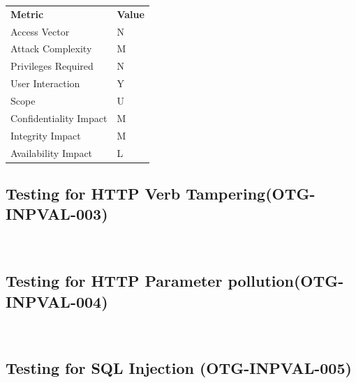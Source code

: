 \documentclass[headsepline,footsepline,footinclude=false,oneside,fontsize=11pt,paper=a4,listof=totoc,bibliography=totoc]{scrbook} %
\begin{document}
\vspace{0.5cm}
\begin{center}
	\begin{tabular}{ll}
		\rowcolor[HTML]{34CDF9}
		{\color[HTML]{ECF4FF} \textbf{Metric}}        & {\color[HTML]{ECF4FF} \textbf{Value}} \\
		\rowcolor[HTML]{BBDAFF}
		{\color[HTML]{333333} Access Vector}          & {\color[HTML]{333333} N}               \\
		\rowcolor[HTML]{ECF4FF}
		{\color[HTML]{333333} Attack Complexity}      & {\color[HTML]{333333} M}               \\
		\rowcolor[HTML]{BBDAFF}
		{\color[HTML]{333333} Privileges Required}    & {\color[HTML]{333333} N}               \\
		\rowcolor[HTML]{ECF4FF}
		{\color[HTML]{333333} User Interaction}       & {\color[HTML]{333333} Y}               \\
		\rowcolor[HTML]{BBDAFF}
		{\color[HTML]{333333} Scope}                  & {\color[HTML]{333333} U}               \\
		\rowcolor[HTML]{ECF4FF}
		{\color[HTML]{333333} Confidentiality Impact} & {\color[HTML]{333333} M}               \\
		\rowcolor[HTML]{BBDAFF}
		{\color[HTML]{333333} Integrity Impact}       & {\color[HTML]{333333} M}               \\
		\rowcolor[HTML]{ECF4FF}
		{\color[HTML]{333333} Availability Impact}    & {\color[HTML]{333333} L}
	\end{tabular}
\end{center}
\pagebreak
\subsection{Testing for HTTP Verb Tampering(OTG-INPVAL-003)}\

\pagebreak
\subsection{Testing for HTTP Parameter pollution(OTG-INPVAL-004)}\
\pagebreak
\subsection{Testing for SQL Injection  (OTG-INPVAL-005)}\
\end{document}
